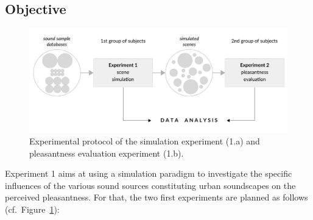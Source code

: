 \documentclass[12pt]{elsarticle}
\newcommand{\cf}{cf.}
\begin{document}
\subsection{Objective}

\begin{figure}[t]
        \includegraphics[width=\linewidth]{gfx/5.pdf}
        \caption{Experimental protocol of the simulation experiment (1.a) and pleasantness evaluation experiment (1.b).}\label{fig:xp1_2}
\end{figure}


Experiment 1 aims at using a simulation paradigm to investigate the specific influences of the various sound sources constituting urban soundscapes on the perceived pleasantness. For that, the two first experiments are planned as follows (\cf~Figure~\ref{fig:xp1_2}):
\end{document}
